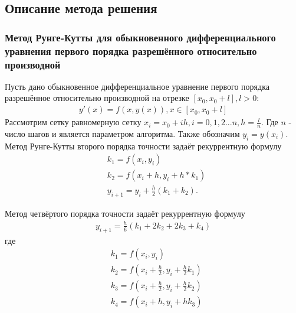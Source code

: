 \documentclass[a4paper,12pt,titlepage,finall]{article}
\begin{document}
\subsection{Описание метода решения}
\subsubsection{Метод Рунге-Кутты для обыкновенного дифференциального уравнения первого порядка разрешённого относительно производной}
Пусть дано обыкновенное дифференциальное уравнение первого порядка разрешённое относительно производной на отрезке $[x_0, x_0 + l], l > 0$:
\begin{align*}
y'(x)=f(x,y(x)), x \in [x_0, x_0 + l]
\end{align*}
Рассмотрим сетку равномерную сетку $x_i = x_0 + ih, i = 0, 1, 2 ... n, h = \frac{l}{n}$. Где $n$ - число шагов и является параметром алгоритма. Также обозначим $y_i = y(x_i)$. Метод Рунге-Кутты второго порядка точности задаёт рекуррентную формулу
\begin{align*}
&k_1 = f(x_i, y_i)\\
&k_2 = f(x_i + h, y_i + h * k_1)\\
&y_{i + 1} = y_i + \frac{h}{2}(k_1 + k_2).
\end{align*} 
\par
Метод четвёртого порядка точности задаёт рекуррентную формулу
\begin{align*}
y_{i+1} = \frac{h}{6} (k_1 +2k_2 + 2k_3 + k_4)
\end{align*}
где
\begin{align*}
&k_1 = f(x_i, y_i)\\
&k_2 = f(x_i + \frac{h}{2}, y_i + \frac{h}{2}k_1)\\
&k_3 = f(x_i + \frac{h}{2}, y_i + \frac{h}{2}k_2)\\
&k_4 = f(x_i + h, y_i + hk_3)
\end{align*}
\end{document}

